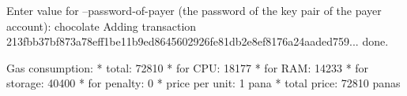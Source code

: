 \begin{shellbox}\begin{ttlst}
Enter value for --password-of-payer (the password of the key pair of the payer account): chocolate
Adding transaction 213fbb37bf873a78eff1be11b9ed8645602926fe81db2e8ef8176a24aaded759... done.

Gas consumption:
 * total: 72810
   * for CPU: 18177
   * for RAM: 14233
   * for storage: 40400
   * for penalty: 0
 * price per unit: 1 pana
 * total price: 72810 panas
\end{ttlst}\end{shellbox}
